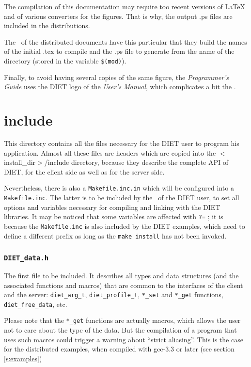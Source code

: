   The compilation of this documentation may require too recent versions of \LaTeX
  and of various converters for the figures. That is why, the output \textsf{.ps}
  files are included in the distributions.


  The \makeam\ of the distributed documents have this particular that they build
  the names of the initial \textsf{.tex} to compile and the \textsf{.ps} file to
  generate from the name of the directory (stored in the variable \verb+$(mod)+).

  Finally, to avoid having several copies of the same figure, the
  \textit{Programmer's Guide} uses the DIET logo of the \textit{User's Manual},
  which complicates a bit the \makeam.



  \section{\textsf{include}}
  \label{s:include}

  This directory contains all the files necessary for the DIET user to program his
  application. Almost all these files are headers which are copied into the
  \textsf{$<$install\_dir$>$/include} directory, because they describe the
  complete API of DIET, for the client side as well as for the server side.

  Nevertheless, there is also a \texttt{Makefile.inc.in} which will be configured
  into a \texttt{Makefile.inc}. The latter is to be included by the \make\ of the
  DIET user, to set all options and variables necessary for compiling and linking
  with the DIET libraries. It may be noticed that some variables are affected with
  \texttt{?=} ; it is because the \texttt{Makefile.inc} is also included by the
  DIET examples, which need to define a different prefix as long as the
  \texttt{make install} has not been invoked.



  \subsubsection{\tt DIET\_data.h}

  The first file to be included. It describes all types and data structures (and
      the associated functions and macros) that are common to the interfaces of the
  client and the server: \verb+diet_arg_t+, \verb+diet_profile_t+, \verb+*_set+
  and \verb+*_get+ functions, \verb+diet_free_data+, etc.

  Please note that the \verb+*_get+ functions are actually macros, which allows
  the user not to care about the type of the data. But the compilation of a
  program that uses such macros could trigger a warning about ``strict aliasing''.
  This is the case for the distributed examples, when compiled with
\textsf{gcc-3.3} or later (see section \ref{s:examples})


